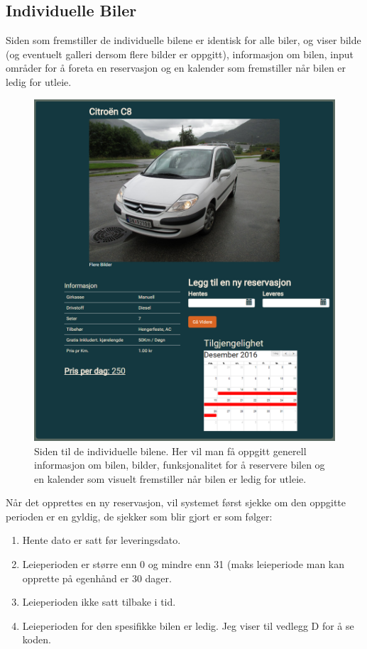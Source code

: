 \subsection{Individuelle Biler}
Siden som fremstiller de individuelle bilene er identisk for alle biler, og viser bilde (og eventuelt galleri dersom flere bilder er oppgitt), informasjon om bilen, input områder for å foreta en reservasjon og en kalender som fremstiller når bilen er ledig for utleie.

 \begin{figure}[htbp]
	\centering
		\includegraphics[scale=0.3]{Bilder/rv_individualcar.png}
	\caption[Individuelle Biler]{ Siden til de individuelle bilene. Her vil man få oppgitt generell informasjon om bilen, bilder, funksjonalitet for å reservere bilen og en kalender som visuelt fremstiller når bilen er ledig for utleie.} %
	\label{fig:rv_individualcar}
\end{figure}

Når det opprettes en ny reservasjon, vil systemet først sjekke om den oppgitte perioden er en gyldig, de sjekker som blir gjort er som følger:
\begin{enumerate}
\item Hente dato er satt før leveringsdato.
\item Leieperioden er større enn 0 og mindre enn 31 (maks leieperiode man kan opprette på egenhånd er 30 dager.
\item Leieperioden ikke satt tilbake i tid.
\item Leieperioden for den spesifikke bilen er ledig. Jeg viser til vedlegg D for å se koden.
\end{enumerate}

